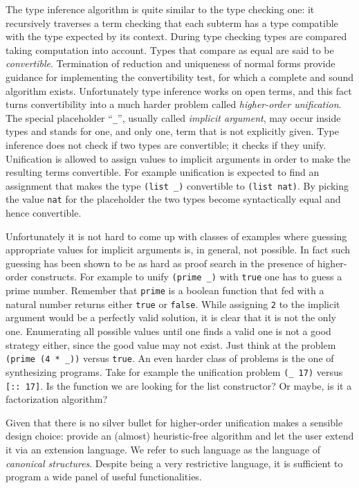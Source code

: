 The type inference algorithm is quite similar to the type checking
one: it recursively traverses a term checking that each subterm has a
type compatible with the type expected by its context.  During type
checking types are compared taking computation into account.  Types
that compare as equal are said to be \emph{convertible}.
Termination of reduction and uniqueness of normal forms provide
guidance for implementing the convertibility test, for which a
complete and sound algorithm exists.  Unfortunately type
inference works on open terms, and this fact turns convertibility into
a much harder problem called \emph{higher-order unification}.  The
special placeholder ``\lstinline/_/'', usually called \emph{implicit
argument}, may occur inside types and stands for one, and only one,
term that is not explicitly given.  Type inference does not check if
two types are convertible; it checks if they unify.
Unification is allowed to assign values to implicit arguments in order
to make the resulting terms convertible.  For example unification is
expected to find an assignment that makes the type
\lstinline/(list _)/ convertible to \lstinline/(list nat)/.
By picking the value \lstinline/nat/ for the placeholder
the two types become syntactically equal and hence convertible.

Unfortunately it is not hard to come up with classes of examples where
guessing appropriate values for implicit arguments is, in general, not
possible. In fact such guessing has been shown to be as hard as proof
search in the presence of higher-order constructs.
For example to unify \lstinline/(prime _)/ with
\lstinline/true/ one has to guess a prime number. Remember that
\lstinline/prime/ is a boolean function that fed with a natural
number returns either \lstinline/true/ or \lstinline/false/.
While assigning \lstinline/2/ to the implicit argument
would be a perfectly valid solution, it is clear
that it is not the only one.  Enumerating all possible
values until one finds a valid one is not a good strategy
either, since the good value may not exist.  Just think at the
problem \lstinline/(prime (4 * _))/ versus \lstinline/true/.  An even
harder class of problems is the one of synthesizing programs.
Take for example the unification problem \lstinline/(_ 17)/ versus
\lstinline/[:: 17]/.  Is the function we are looking for the list
constructor? Or maybe, is it a factorization algorithm?

Given that there is no silver bullet for higher-order unification
\Coq{} makes a sensible design choice: provide an (almost)
heuristic-free algorithm and let the user extend it via an extension
language.  We refer to such language as the language of
\emph{canonical structures}.  Despite being a very restrictive language,
it is sufficient to program a wide panel of useful functionalities.

